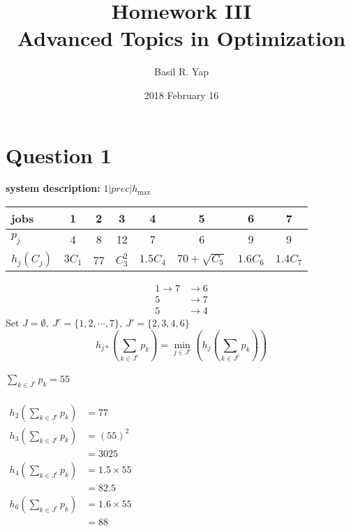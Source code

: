 \documentclass[a4paper, fleqn]{article}
\begin{document}
\title{Homework III \\ Advanced Topics in Optimization}
\author{Basil R. Yap}
\date{2018 February 16}
\maketitle

\section{Question 1}
\textbf{system description: }$1|prec|h_{\max}$
\begin{center}
\begin{tabular}{| l | c | c | c | c | c | c | c |}
\hline
jobs & 1 & 2 & 3 & 4 & 5 & 6 & 7 \\
\hline
$p_j$ & 4 & 8 & 12 & 7 & 6 & 9 & 9 \\
$h_j(C_j)$ & $3C_1$ & 77 & $C_3^2$ & $1.5C_4$ & $70+\sqrt{C_5}$ & $1.6C_6$ & $1.4C_7$ \\
\hline
\end{tabular}
\end{center}
$$
\begin{aligned}
1\rightarrow 7&\rightarrow6\\
5&\rightarrow7\\
5&\rightarrow4
\end{aligned}
$$
Set $J=\emptyset,\ J^c=\{1,2,\cdots,7\},\ J'=\{2,3,4,6\}$
$$
h_{j*}\left(\sum_{k\in J^c}p_k\right)=\min_{j\in J'}\left(h_j\left(\sum_{k\in J^c}p_k\right)\right)
$$
\vspace{1pt}\\
$\sum_{k\in J^c}p_k=55$\\
\vspace{1pt}\\
$\begin{aligned}h_2\left(\sum_{k\in J^c}p_k\right)&=77\end{aligned}$\\
$\begin{aligned}h_3\left(\sum_{k\in J^c}p_k\right)&=(55)^2\\&=3025\end{aligned}$\\
$\begin{aligned}h_4\left(\sum_{k\in J^c}p_k\right)&=1.5\times55\\&=82.5\end{aligned}$\\
$\begin{aligned}h_6\left(\sum_{k\in J^c}p_k\right)&=1.6\times55\\&=88\end{aligned}$\\
\end{document}
